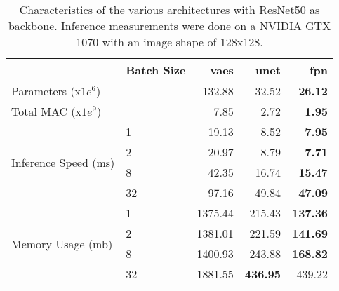 \begin{table}[ht]
\centering
\caption{Characteristics of the various architectures with ResNet50 as backbone. Inference measurements were done on a NVIDIA GTX 1070 with an image shape of 128x128.}
\label{tab:model_characteristics}
\begin{tabular}{llrrr}
\toprule
 & Batch Size & vaes & unet & fpn \\
\midrule
Parameters (x$1e^6$) &   & 132.88 & 32.52 & \textbf{26.12} \\
\cline{1-5}
Total MAC (x$1e^9$) &   & 7.85 & 2.72 & \textbf{1.95} \\
\cline{1-5}
\multirow[t]{4}{*}{Inference Speed (ms)} & 1 & 19.13 & 8.52 & \textbf{7.95} \\
 & 2 & 20.97 & 8.79 & \textbf{7.71} \\
 & 8 & 42.35 & 16.74 & \textbf{15.47} \\
 & 32 & 97.16 & 49.84 & \textbf{47.09} \\
\cline{1-5}
\multirow[t]{4}{*}{Memory Usage (mb)} & 1 & 1375.44 & 215.43 & \textbf{137.36} \\
 & 2 & 1381.01 & 221.59 & \textbf{141.69} \\
 & 8 & 1400.93 & 243.88 & \textbf{168.82} \\
 & 32 & 1881.55 & \textbf{436.95} & 439.22 \\
\cline{1-5}
\bottomrule
\end{tabular}
\end{table}
